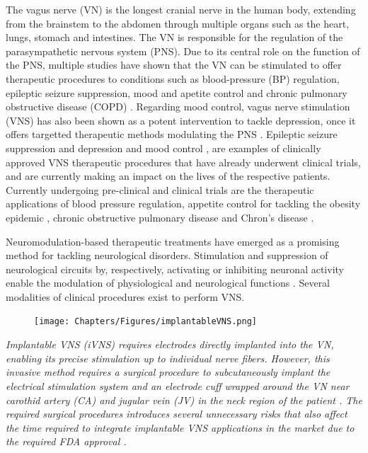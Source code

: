 \par
The vagus nerve (VN) is the longest cranial nerve in the human body, extending
from the brainstem to the abdomen through multiple organs such as the heart,
lungs, stomach and intestines. The VN is responsible for the regulation of the
parasympathetic nervous system (PNS). Due to its central role on the function of the
PNS, multiple studies have shown that the VN can be stimulated to offer therapeutic
procedures to conditions such as blood-pressure (BP) regulation, epileptic seizure
suppression, mood and apetite control and chronic pulmonary obstructive disease
(COPD) \cite[*]{Goggins2022, Ji2020, Lescrauwaet2022, Browning2017, Undem2005}. 
Regarding mood control, vagus nerve stimulation (VNS) has also been shown as a potent intervention to tackle depression, once it offers targetted therapeutic methods modulating the PNS \cite{DepressionVNS}. Epileptic seizure suppression \cite{} and depression and mood control \cite{}, are examples of clinically approved VNS therapeutic procedures that have already underwent clinical trials, and are currently making an impact on the lives of the respective patients. Currently undergoing pre-clinical and clinical trials are the therapeutic applications of blood pressure regulation, appetite control for tackling the obesity epidemic \cite{},  chronic obstructive pulmonary disease \cite{} and Chron's disease \cite{}. 

\par
Neuromodulation-based therapeutic treatments have emerged as a promising method 
for tackling neurological disorders. Stimulation and suppression of neurological circuits by, respectively, activating or inhibiting neuronal activity enable the modulation of physiological and neurological functions \cite{Fomenko2018,Dalecki2004}. Several modalities of clinical procedures exist to perform VNS. 

\begin{figure}[ht]
  \centering
  \texttt{[image: Chapters/Figures/implantableVNS.png]}
  \label{fig:implantable_electrode_vns}
\end{figure}

\it{Implantable VNS (iVNS)} requires electrodes directly implanted into the VN, enabling its precise stimulation up to individual nerve fibers. However, this invasive method requires a surgical procedure to subcutaneously implant the electrical stimulation system and an electrode cuff wrapped around the VN near carothid artery (CA) and jugular vein (JV) in the neck region of the patient \cite{}. The required surgical procedures introduces several unnecessary risks that also affect the time required to integrate implantable VNS applications in the market due to the required FDA approval \cite{}. 

